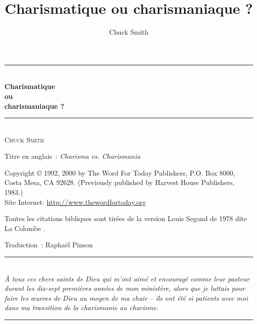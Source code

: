 \documentclass[paper=6.13in:9.21in,pagesize=pdftex,12pt,DIV=calc]{scrbook}
\title{Charismatique ou \og charismaniaque \fg{}?}
\author{Chuck Smith}
\begin{document}
\newcommand{\HRule}{\rule{\linewidth}{0.5mm}}

\pagestyle{empty}

\begin{titlepage}
\begin{center}
\mbox{}
\vfill
\HRule \\[0.4cm]
{ \LARGE \bfseries Charismatique\\ ou\\ \og charismaniaque \fg{}?}\\[0.4cm]

\HRule \\[1.5cm]
\textsc{\Large Chuck Smith}\\[1.5cm]
\vfill
\mbox{}
\end{center}
\end{titlepage}


\newpage
\mbox{}
\vfill
Titre en anglais~: \emph{Charisma vs. Charismania}

Copyright \copyright{} 1992, 2000 by The Word For Today Publishers, P.O. Box 8000, \\
Costa Mesa, CA 92628. (Previously published by Harvest House Publishers, 1983.) \\
Site Internet: \url{http://www.thewordfortoday.org}

Toutes les citations bibliques sont tirées de la version Louis Segond de 1978
 dite \og La Colombe \fg{}.

Traduction~: Raphaël Pinson


\newpage
\mbox{}
\vfill
\begin{center}
\HRule \\[0.4cm]
\emph{À tous ces chers saints de Dieu qui m'ont aimé et encouragé comme leur
 pasteur durant les dix-sept premières années de mon ministère, alors que je
 luttais pour faire les œuvres de Dieu au moyen de ma chair -- ils ont été
 si patients avec moi dans ma transition de la charismanie au charisme.}
\HRule \\[1.5cm]
\end{center}
\vfill
\mbox{}
\newpage


\tableofcontents

\cleardoublepage
\pagestyle{headings}







\printindex
\end{document}
